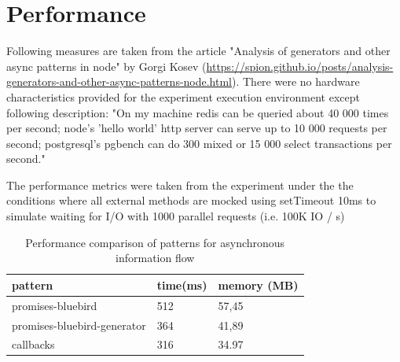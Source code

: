 





\section{Performance}
Following measures are taken from the article "Analysis of generators and other async patterns in node" by Gorgi Kosev (\url{https://spion.github.io/posts/analysis-generators-and-other-async-patterns-node.html}). There were no hardware characteristics provided for the experiment execution environment except following description\cite{asyncPerformance_2}: "On my machine redis can be queried about 40 000 times per second; node's 'hello world' http server can serve up to 10 000 requests per second; postgresql's pgbench can do 300 mixed or 15 000 select transactions per second." 

 The performance metrics were taken from the experiment under the the conditions where all external methods are mocked using setTimeout 10ms to simulate waiting for I/O with 1000 parallel requests (i.e. 100K IO / s) \cite{asyncPerformance_2}

\begin{table}[h]
	\begin{center}
		\begin{tabular}{| l | l | l | }
			\hline
			\textbf{pattern} & \textbf{time(ms)} & \textbf{memory (MB)} \\
			\hline
			promises-bluebird & 512 & 57,45 \\
			\hline
			promises-bluebird-generator & 364 & 41,89 \\
			\hline
			callbacks & 316 & 34.97 \\
			\hline
		\end{tabular}
	\end{center}
	\caption{Performance comparison of patterns for asynchronous information flow \cite{asyncPerformance_2}\cite{asyncPerformance}}
\end{table}


